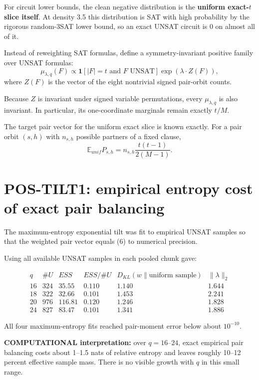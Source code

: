 \documentclass[11pt]{article}
\begin{document}
For circuit lower bounds, the clean negative distribution is the
\textbf{uniform exact-\(t\) slice itself}.  At density 3.5 this distribution
is SAT with high probability by the rigorous random-3SAT lower bound, so an
exact UNSAT circuit is 0 on almost all of it.

Instead of reweighting SAT formulas, define a symmetry-invariant positive
family over UNSAT formulas:
\[
\mu_{\lambda,q}(F)
\propto
\mathbf 1[
|F|=t\text{ and }F\text{ UNSAT}
]
\exp\left(
\lambda\cdot Z(F)
\right),
\tag{5}
\]
where \(Z(F)\) is the vector of the eight nontrivial signed pair-orbit
counts.

Because \(Z\) is invariant under signed variable permutations, every
\(\mu_{\lambda,q}\) is also invariant.  In particular, its one-coordinate
marginals remain exactly \(t/M\).

The target pair vector for the uniform exact slice is known exactly.  For a
pair orbit \((s,h)\) with \(n_{s,h}\) possible partners of a fixed clause,
\[
\mathbb E_{unif} P_{s,h}
=
n_{s,h}
\frac{t(t-1)}{2(M-1)}.
\tag{6}
\]

\section{POS-TILT1: empirical entropy cost of exact pair balancing}

The maximum-entropy exponential tilt was fit to empirical UNSAT samples so
that the weighted pair vector equals (6) to numerical precision.

Using all available UNSAT samples in each pooled chunk gave:

\[
\begin{array}{c|c|c|c|c|c}
q&\#U&ESS&ESS/\#U&D_{KL}(w\|\text{uniform sample})&
\|\lambda\|_2\\
\hline
16&324&35.55&0.110&1.140&1.644\\
18&322&32.66&0.101&1.453&2.241\\
20&976&116.81&0.120&1.246&1.828\\
24&827&83.47&0.101&1.341&1.886
\end{array}
\]

All four maximum-entropy fits reached pair-moment error below about
\(10^{-10}\).

\textbf{COMPUTATIONAL interpretation:} over \(q=16\)--\(24\), exact empirical
pair balancing costs about 1--1.5 nats of relative entropy and leaves roughly
10--12 percent effective sample mass.  There is no visible growth with
\(q\) in this small range.
\end{document}
